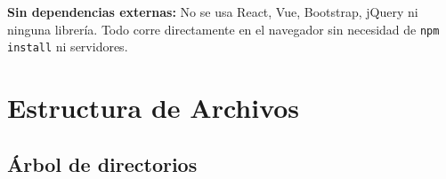 \documentclass[12pt, a4paper]{article}
\begin{document}
\begin{cajaInfo}
    \textbf{Sin dependencias externas:} No se usa React, Vue, Bootstrap,
    jQuery ni ninguna librería. Todo corre directamente en el navegador
    sin necesidad de \texttt{npm install} ni servidores.
\end{cajaInfo}


\section{Estructura de Archivos}

\subsection{Árbol de directorios}
\end{document}
